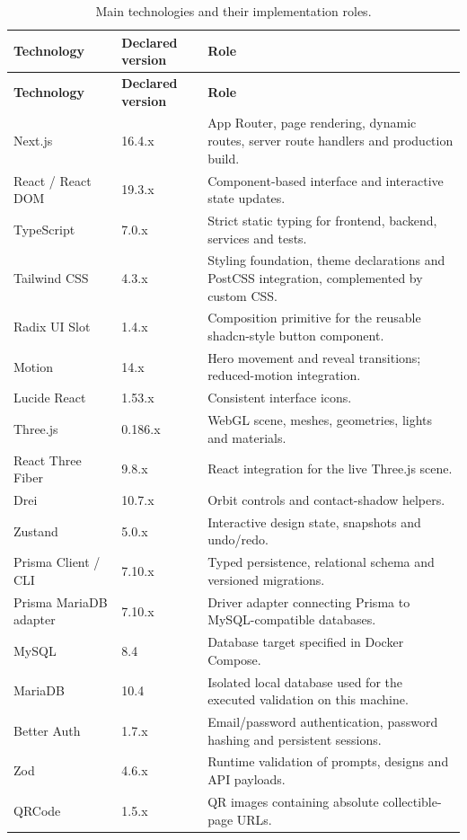 \documentclass[11pt,a4paper]{article}
\begin{document}
\begin{longtable}{p{3.5cm}p{2.1cm}p{8.1cm}}
\caption{Main technologies and their implementation roles.}\label{tab:stack}\\
\toprule
\textbf{Technology} & \textbf{Declared version} & \textbf{Role}\\
\midrule\endfirsthead
\toprule
\textbf{Technology} & \textbf{Declared version} & \textbf{Role}\\
\midrule\endhead
Next.js & 16.4.x & App Router, page rendering, dynamic routes, server route handlers and production build.\\
React / React DOM & 19.3.x & Component-based interface and interactive state updates.\\
TypeScript & 7.0.x & Strict static typing for frontend, backend, services and tests.\\
Tailwind CSS & 4.3.x & Styling foundation, theme declarations and PostCSS integration, complemented by custom CSS.\\
Radix UI Slot & 1.4.x & Composition primitive for the reusable shadcn-style button component.\\
Motion & 14.x & Hero movement and reveal transitions; reduced-motion integration.\\
Lucide React & 1.53.x & Consistent interface icons.\\
Three.js & 0.186.x & WebGL scene, meshes, geometries, lights and materials.\\
React Three Fiber & 9.8.x & React integration for the live Three.js scene.\\
Drei & 10.7.x & Orbit controls and contact-shadow helpers.\\
Zustand & 5.0.x & Interactive design state, snapshots and undo/redo.\\
Prisma Client / CLI & 7.10.x & Typed persistence, relational schema and versioned migrations.\\
Prisma MariaDB adapter & 7.10.x & Driver adapter connecting Prisma to MySQL-compatible databases.\\
MySQL & 8.4 & Database target specified in Docker Compose.\\
MariaDB & 10.4 & Isolated local database used for the executed validation on this machine.\\
Better Auth & 1.7.x & Email/password authentication, password hashing and persistent sessions.\\
Zod & 4.6.x & Runtime validation of prompts, designs and API payloads.\\
QRCode & 1.5.x & QR images containing absolute collectible-page URLs.\\

\end{longtable}
\end{document}
